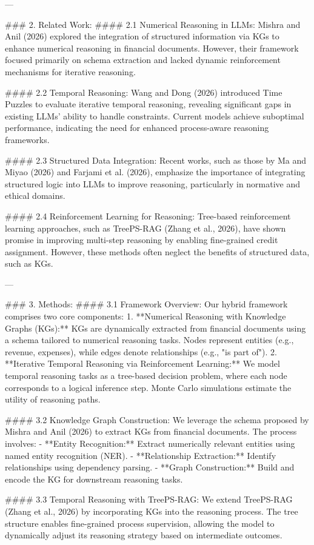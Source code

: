 ---

### 2. Related Work:
#### 2.1 Numerical Reasoning in LLMs:
Mishra and Anil (2026) explored the integration of structured information via KGs to enhance numerical reasoning in financial documents. However, their framework focused primarily on schema extraction and lacked dynamic reinforcement mechanisms for iterative reasoning.

#### 2.2 Temporal Reasoning:
Wang and Dong (2026) introduced Time Puzzles to evaluate iterative temporal reasoning, revealing significant gaps in existing LLMs' ability to handle constraints. Current models achieve suboptimal performance, indicating the need for enhanced process-aware reasoning frameworks.

#### 2.3 Structured Data Integration:
Recent works, such as those by Ma and Miyao (2026) and Farjami et al. (2026), emphasize the importance of integrating structured logic into LLMs to improve reasoning, particularly in normative and ethical domains.

#### 2.4 Reinforcement Learning for Reasoning:
Tree-based reinforcement learning approaches, such as TreePS-RAG (Zhang et al., 2026), have shown promise in improving multi-step reasoning by enabling fine-grained credit assignment. However, these methods often neglect the benefits of structured data, such as KGs.

---

### 3. Methods:
#### 3.1 Framework Overview:
Our hybrid framework comprises two core components:
1. **Numerical Reasoning with Knowledge Graphs (KGs):** KGs are dynamically extracted from financial documents using a schema tailored to numerical reasoning tasks. Nodes represent entities (e.g., revenue, expenses), while edges denote relationships (e.g., "is part of").
2. **Iterative Temporal Reasoning via Reinforcement Learning:** We model temporal reasoning tasks as a tree-based decision problem, where each node corresponds to a logical inference step. Monte Carlo simulations estimate the utility of reasoning paths.

#### 3.2 Knowledge Graph Construction:
We leverage the schema proposed by Mishra and Anil (2026) to extract KGs from financial documents. The process involves:
- **Entity Recognition:** Extract numerically relevant entities using named entity recognition (NER).
- **Relationship Extraction:** Identify relationships using dependency parsing.
- **Graph Construction:** Build and encode the KG for downstream reasoning tasks.

#### 3.3 Temporal Reasoning with TreePS-RAG:
We extend TreePS-RAG (Zhang et al., 2026) by incorporating KGs into the reasoning process. The tree structure enables fine-grained process supervision, allowing the model to dynamically adjust its reasoning strategy based on intermediate outcomes.

